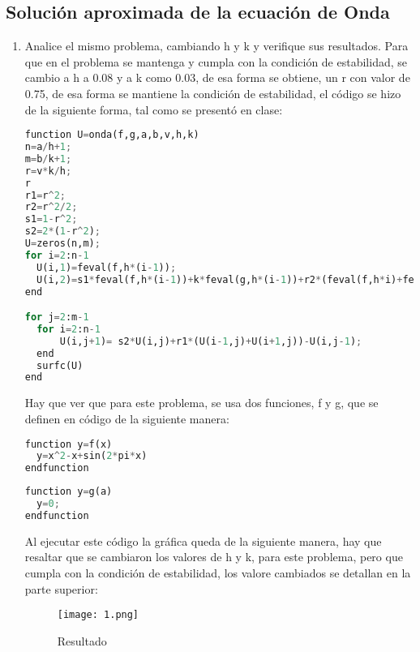 \documentclass{article}
\begin{document}
\begin{flushleft}
  

\section{Solución aproximada de la ecuación de Onda}

\begin{enumerate}
    \item Analice el mismo problema, cambiando h y k y verifique sus resultados.
    \vspace{0.2 cm}
    Para que en el problema se mantenga y cumpla con la condición de estabilidad, se cambio a h a $0.08$ y a k como $0.03$, de esa forma se obtiene, un r con valor de 0.75, de esa forma se mantiene la condición de estabilidad, el código se hizo de la siguiente forma, tal como se presentó en clase:
    
    \begin{lstlisting}[language=Python,caption=Código para ejercicio 1]
function U=onda(f,g,a,b,v,h,k)
n=a/h+1;
m=b/k+1;
r=v*k/h;
r
r1=r^2;
r2=r^2/2;
s1=1-r^2;
s2=2*(1-r^2);
U=zeros(n,m);
for i=2:n-1
  U(i,1)=feval(f,h*(i-1));
  U(i,2)=s1*feval(f,h*(i-1))+k*feval(g,h*(i-1))+r2*(feval(f,h*i)+feval(f,h*(i-2)));
end

for j=2:m-1
  for i=2:n-1
      U(i,j+1)= s2*U(i,j)+r1*(U(i-1,j)+U(i+1,j))-U(i,j-1);
  end
  surfc(U)
end


\end{lstlisting}


Hay que ver que para este problema, se usa dos funciones, f y g, que se definen en código de la siguiente manera:

   \begin{lstlisting}[language=Python,caption=Función f]
function y=f(x)
  y=x^2-x+sin(2*pi*x)
endfunction
\end{lstlisting}

  \begin{lstlisting}[language=Python,caption=Función g]
function y=g(a)
  y=0;
endfunction
\end{lstlisting}

Al ejecutar este código la gráfica queda de la siguiente manera, hay que resaltar que se cambiaron los valores de h y k, para este problema, pero que cumpla con la condición de estabilidad, los valore cambiados se detallan en la parte superior:

\begin{figure}[H]
        \centering
         \texttt{[image: 1.png]}
        \caption{Resultado}
\end{figure}   


\end{enumerate}
\end{flushleft}
\end{document}
